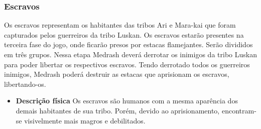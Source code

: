 \subsubsection{Escravos}
Os escravos representam os habitantes das tribos Ari e Mara-kai que foram capturados pelos guerreiros da tribo Luskan. Os escravos estarão presentes na terceira fase do jogo, onde ficarão presos por estacas flamejantes. Serão divididos em três grupos. Nessa etapa Medrash deverá derrotar os inimigos da tribo Luskan para poder libertar os respectivos escravos. Tendo derrotado todos os guerreiros inimigos, Medrash poderá destruir as estacas que aprisionam os escravos, libertando-os.
\begin{itemize}
\item{\bf Descrição física}
Os escravos são humanos com a mesma aparência dos demais habitantes de sua tribo. Porém, devido ao aprisionamento, encontram-se visivelmente mais magros e debilitados.
\end{itemize}
